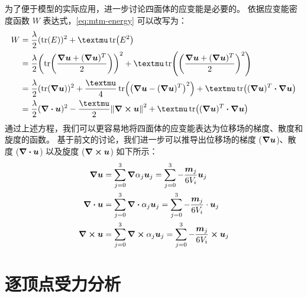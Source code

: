 为了便于模型的实际应用，进一步讨论四面体的应变能是必要的。
依据应变能密度函数 $W$ 表达式，\eqref{eq:mtm-energy} 可以改写为：
\begin{equation}
  \begin{split}
    W
     & = \frac{\lambda}{2} (\tr(E))^2 + \mu \tr(E^2)                                                                                                               \\
     & = \frac{\lambda}{2} \pqty{\tr(\frac{\grad{\bm{u}} + (\grad{\bm{u}})^T}{2})}^2 + \mu \tr(\pqty{\frac{\grad{\bm{u}} + (\grad{\bm{u}})^T}{2}}^2)               \\
     & = \frac{\lambda}{2} (\tr(\grad{\bm{u}}))^2 + \frac{\mu}{4} \tr(\pqty{\grad{\bm{u}} - (\grad{\bm{u}})^T}^2) + \mu \tr((\grad{\bm{u}})^T \vdot \grad{\bm{u}}) \\
     & = \frac{\lambda}{2} (\divergence{\bm{u}})^2 - \frac{\mu}{2} \norm{\curl{\bm{u}}}^2 + \mu \tr((\grad{\bm{u}})^T \vdot \grad{\bm{u}})
  \end{split}
\end{equation}
通过上述方程，我们可以更容易地将四面体的应变能表达为位移场的梯度、散度和旋度的函数。
基于前文的讨论，我们进一步可以推导出位移场的梯度 ($\grad{\bm{u}}$)、散度 ($\divergence{\bm{u}}$) 以及旋度 ($\curl{\bm{u}}$) 如下所示：
\begin{align}
  \grad{\bm{u}}
   & = \sum_{j = 0}^3 \grad{\alpha_j} \bm{u}_j
  = \sum_{j = 0}^3 - \frac{\bm{m}_j}{6 V_i} \bm{u}_j       \\
  \divergence{\bm{u}}
   & = \sum_{j = 0}^3 \divergence{\alpha_j} \bm{u}_j
  = \sum_{j = 0}^3 - \frac{\bm{m}_j}{6 V_i} \cdot \bm{u}_j \\
  \curl{\bm{u}}
   & = \sum_{j = 0}^3 \curl{\alpha_j} \bm{u}_j
  = \sum_{j = 0}^3 - \frac{\bm{m}_j}{6 V_i} \cp \bm{u}_j
\end{align}

\section{逐顶点受力分析}
\label{sec:mtm:force}

